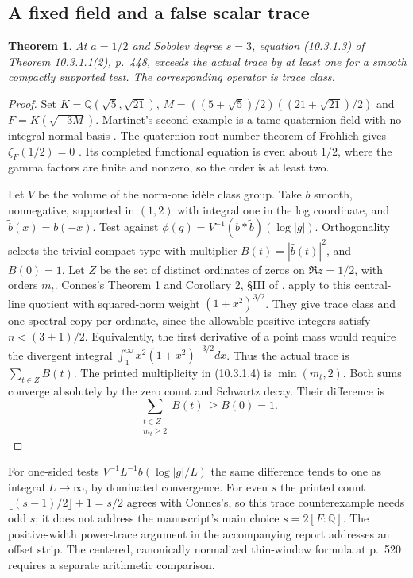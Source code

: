 \documentclass[11pt,reqno]{amsart}
\newtheorem{theorem}{Theorem}[section]
\numberwithin{equation}{section}
\newcommand{\Q}{\mathbb Q}\newcommand{\R}{\mathbb R}\newcommand{\C}{\mathbb C}\newcommand{\Z}{\mathbb Z}
\begin{document}
\subsection{A fixed field and a false scalar trace}\label{sec:central}
\begin{theorem}
At \(a=1/2\) and Sobolev degree \(s=3\), equation (10.3.1.3) of Theorem 10.3.1.1(2), p.~448, exceeds the actual trace by at least one for a smooth compactly supported test. The corresponding operator is trace class.
\end{theorem}
\begin{proof}
Set \(K=\Q(\sqrt5,\sqrt{21})\),
\(M=((5+\sqrt5)/2)((21+\sqrt{21})/2)\) and \(F=K(\sqrt{-3M})\).
Martinet's second example is a tame quaternion field with no integral normal basis \cite{martinet}. The quaternion root-number theorem of Fr\"ohlich gives \(\zeta_F(1/2)=0\) \cite{root}. Its completed functional equation is even about \(1/2\), where the gamma factors are finite and nonzero, so the order is at least two.

Let \(V\) be the volume of the norm-one id\`ele class group. Take \(b\) smooth, nonnegative, supported in \((1,2)\) with integral one in the log coordinate, and \(\widetilde b(x)=b(-x)\). Test against \(\phi(g)=V^{-1}(b*\widetilde b)(\log |g|)\). Orthogonality selects the trivial compact type with multiplier \(B(t)=|\widehat b(t)|^2\), and \(B(0)=1\). Let \(Z\) be the set of distinct ordinates of zeros on \(\Re z=1/2\), with orders \(m_t\).
Connes's Theorem 1 and Corollary 2, \S III of \cite{connes}, apply to this central-line quotient with squared-norm weight \((1+x^2)^{3/2}\). They give trace class and one spectral copy per ordinate, since the allowable positive integers satisfy \(n<(3+1)/2\). Equivalently, the first derivative of a point mass would require the divergent integral \(\int_1^\infty x^2(1+x^2)^{-3/2}dx\).
Thus the actual trace is \(\sum_{t\in Z} B(t)\). The printed multiplicity in (10.3.1.4) is \(\min(m_t,2)\). Both sums converge absolutely by the zero count and Schwartz decay. Their difference is
\[
  \sum_{\substack{t\in Z\\ m_t\ge 2}} B(t) \ \ge B(0)=1 .
\]
\end{proof}
For one-sided tests \(V^{-1}L^{-1}b(\log|g|/L)\) the same difference tends to one as integral \(L\to\infty\), by dominated convergence. For even \(s\) the printed count \(\lfloor(s-1)/2\rfloor+1=s/2\) agrees with Connes's, so this trace counterexample needs odd \(s\); it does not address the manuscript's main choice \(s=2[F:\Q]\). The positive-width power-trace argument in the accompanying report addresses an offset strip. The centered, canonically normalized thin-window formula at p.~520 requires a separate arithmetic comparison.
\end{document}
